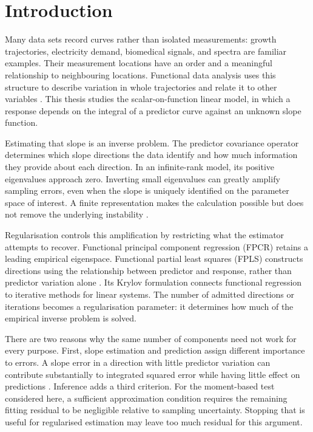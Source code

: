 \chapter{Introduction}
\label{chap:main-introduction}
\label{chap:introduction}

Many data sets record curves rather than isolated measurements: growth
trajectories, electricity demand, biomedical signals, and spectra are familiar
examples. Their measurement locations have an order and a meaningful
relationship to neighbouring locations. Functional data analysis uses this
structure to describe variation in whole trajectories and relate it to other
variables \parencite{ramsay_silverman_2005}. This thesis studies the
scalar-on-function linear model, in which a response depends on the integral
of a predictor curve against an unknown slope function.

Estimating that slope is an inverse problem. The predictor covariance
operator determines which slope directions the data identify and how much
information they provide about each direction. In an infinite-rank model,
its positive eigenvalues approach zero. Inverting small eigenvalues can
greatly amplify sampling errors, even when the slope is uniquely identified
on the parameter space of interest. A finite representation makes the
calculation possible but does not remove the underlying instability
\parencite{cardot_ferraty_sarda_1999,hall_horowitz_2007}.

Regularisation controls this amplification by restricting what the estimator
attempts to recover. Functional principal component regression (FPCR)
retains a leading empirical eigenspace. Functional partial least squares
(FPLS) constructs directions using the relationship between predictor and
response, rather than predictor variation alone
\parencite{preda_saporta_2005,delaigle_hall_2012}. Its Krylov formulation
connects functional regression to iterative methods for linear systems.
The number of admitted directions or iterations becomes a regularisation
parameter: it determines how much of the empirical inverse problem is solved.

There are two reasons why the same number of components need not work for
every purpose. First, slope estimation and prediction assign different
importance to errors. A slope error in a direction with little predictor
variation can contribute substantially to integrated squared error while
having little effect on predictions \parencite{cai_hall_2006}. Inference
adds a third criterion. For the moment-based test considered here, a
sufficient approximation condition requires the remaining fitting residual
to be negligible relative to sampling uncertainty. Stopping that is useful
for regularised estimation may leave too much residual for this argument.

